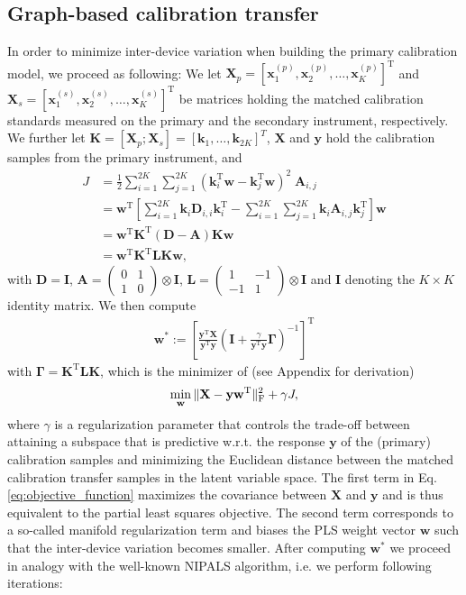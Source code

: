 \documentclass{article}
\newcommand{\T }{^{\text{T}}}
\DeclarePairedDelimiter{\normtwo}{\lVert}{\rVert}
\let\vec\mathbf
\begin{document}
\subsection{Graph-based calibration transfer}
In order to minimize inter-device variation when building the primary calibration model, we proceed as following: We let $\vec X_p = [\vec x_1^{(p)},\vec x_2^{(p)},\dots,\vec x_K^{(p)}]\T$ and $\vec X_s = [\vec x_1^{(s)},\vec x_2^{(s)},\dots,\vec x_K^{(s)}]\T$ be matrices holding the matched calibration standards measured on the primary and the secondary instrument, respectively. We further let $\vec K = [\vec X_p;\vec X_s] = [\vec k_1,\dots,\vec k_{2K}]^T$, $\vec X$ and $\vec y$ hold the calibration samples from the primary instrument, and
\begin{equation}
\label{eqn:regularizer}
\begin{aligned}
J  & =  \frac12\sum_{i=1}^{2K}\sum_{j=1}^{2K} (\vec k_i\T\vec w - \vec k_j\T\vec w)^2\;\vec A_{i,j}\\
& =  \vec w\T \left[ \sum_{i=1}^{2K} \vec k_i\vec D_{i,i}\vec k_i\T - \sum_{i=1}^{2K}\sum_{j=1}^{2K} \vec k_i\vec A_{i,j}\vec k_j\T \right] \vec w\\
& = \vec w\T\vec K\T(\vec D - \vec A)\vec K\vec w\\
& = \vec w\T \vec K\T \vec L \vec K\vec w,
\end{aligned}
\end{equation}
with $\vec D = \vec I$, $\vec A = \begin{pmatrix}
0 & 1\\
1 & 0 \end{pmatrix}\otimes \vec I$, $\vec L = \begin{pmatrix}
1 & -1\\
-1 & 1 \end{pmatrix}\otimes \vec I$ and $\vec I$ denoting the $K\times K$ identity matrix. We then compute
\begin{align}
\label{eq:close_form}
\vec w^{*} := \left[\frac{\vec y\T\vec X}{\vec y\T\vec y}\left(\vec I + \frac{\gamma}{\vec y\T\vec y}\boldsymbol{\Gamma}\right)^{-1}\right]\T
\end{align}
with $\boldsymbol \Gamma = \vec K\T\vec L\vec K$, which is the minimizer of (see Appendix for derivation)
\begin{align}
\label{eq:objective_function}
\min_{\vec w}\,\normtwo{\vec X - \vec y \vec w\T}^2_\text{F} + \gamma J,
\end{align}
where $\gamma$ is a regularization parameter that controls the trade-off between attaining a subspace that is predictive w.r.t. the response $\vec y$ of the (primary) calibration samples and minimizing the Euclidean distance between the matched calibration transfer samples in the latent variable space. The first term in Eq.\eqref{eq:objective_function} maximizes the covariance between $\vec X$ and $\vec y$ and is thus equivalent to the partial least squares objective. The second term corresponds to a so-called manifold regularization term and biases the PLS weight vector $\vec w$ such that the inter-device variation becomes smaller. After computing $\vec w^{*}$ we proceed in analogy with the well-known NIPALS algorithm, i.e. we perform following iterations:
\end{document}
